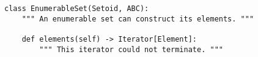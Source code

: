 \begin{verbatim}
class EnumerableSet(Setoid, ABC):
    """ An enumerable set can construct its elements. """

    def elements(self) -> Iterator[Element]:
        """ This iterator could not terminate. """
\end{verbatim}